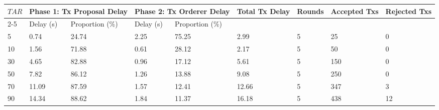 \documentclass[10pt,journal,compsoc, twoside]{IEEEtran}
\begin{document}
\begin{table*}[htbp]
	\caption{Experiment 5: Endorsement Policy "AND", with remote proposer}
	\begin{tabular}{|l|l|l|l|l|l|l|l|l|}
		\hline
		\multirow{2}{*}{$TAR$} & \multicolumn{2}{l|}{Phase 1: Tx Proposal Delay} & \multicolumn{2}{l|}{Phase 2: Tx Orderer Delay} & \multirow{2}{*}{Total Tx Delay} & \multirow{2}{*}{Rounds} & \multirow{2}{*}{Accepted Txs} & \multirow{2}{*}{Rejected Txs} \\ \cline{2-5}
		& Delay (s)           & Proportion (\%)           & Delay (s)           & Proportion (\%)          &                                 &                         &                               &                               \\ \hline
		5                      & 0.74                & 24.74                     & 2.25                & 75.25                    & 2.99                            & 5                       & 25                            & 0                             \\ \hline
		10                     & 1.56                & 71.88                     & 0.61                & 28.12                    & 2.17                            & 5                       & 50                            & 0                             \\ \hline
		30                     & 4.65                & 82.88                     & 0.96                & 17.12                    & 5.61                            & 5                       & 150                           & 0                             \\ \hline
		50                     & 7.82                & 86.12                     & 1.26                & 13.88                    & 9.08                            & 5                       & 250                           & 0                             \\ \hline
		70                     & 11.09               & 87.59                     & 1.57                & 12.41                    & 12.66                           & 5                       & 347                           & 3                             \\ \hline
		90                     & 14.34               & 88.62                     & 1.84                & 11.37                    & 16.18                           & 5                       & 438                           & 12                            \\ \hline
	\end{tabular}
\end{table*}
\end{document}
